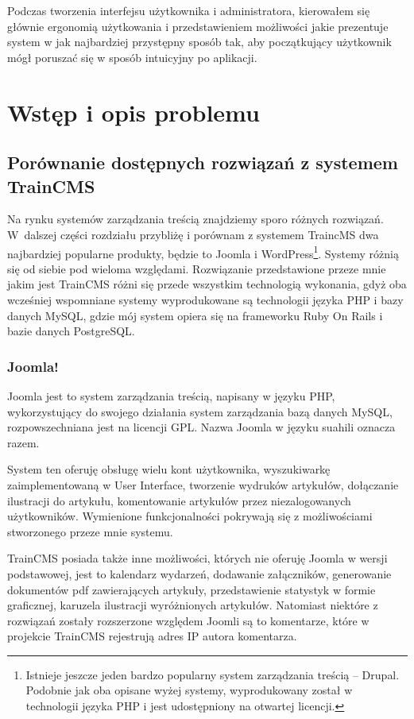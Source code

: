 \documentclass[openright]{xmgr}
\begin{document}
Podczas tworzenia interfejsu użytkownika i administratora, kierowałem się głównie ergonomią użytkowania i przedstawieniem możliwości jakie prezentuje system w jak najbardziej przystępny sposób tak, aby początkujący użytkownik mógł poruszać się w sposób intuicyjny po aplikacji.

\chapter{Wstęp i opis problemu}

\section{Porównanie dostępnych rozwiązań z systemem TrainCMS}

Na rynku systemów zarządzania treścią znajdziemy sporo różnych rozwiązań. W~dalszej części rozdziału przybliżę i porównam z systemem TraincMS dwa najbardziej popularne produkty, będzie to Joomla i WordPress\footnote{Istnieje jeszcze jeden bardzo popularny system zarządzania treścią -- Drupal. Podobnie jak oba opisane wyżej systemy, wyprodukowany został w technologii języka PHP i jest udostępniony na otwartej licencji.}. Systemy różnią się od siebie pod wieloma względami. Rozwiązanie przedstawione przeze mnie jakim jest TrainCMS różni się  przede wszystkim technologią wykonania, gdyż oba wcześniej wspomniane systemy wyprodukowane są technologii języka PHP i bazy danych MySQL, gdzie mój system opiera się na frameworku Ruby On Rails i bazie danych PostgreSQL.

\subsection{Joomla!}

Joomla jest to system zarządzania treścią, napisany w języku PHP, wykorzystujący do swojego działania system zarządzania bazą danych MySQL, rozpowszechniana jest na licencji GPL. Nazwa Joomla w języku suahili oznacza razem.

System ten oferuję obsługę wielu kont użytkownika, wyszukiwarkę zaimplementowaną w User Interface, tworzenie wydruków artykułów, dołączanie ilustracji do artykułu, komentowanie artykułów przez niezalogowanych użytkowników. Wymienione funkcjonalności pokrywają się z możliwościami stworzonego przeze mnie systemu. 

\newpage

TrainCMS posiada także inne możliwości, których nie oferuję Joomla w wersji podstawowej, jest to kalendarz wydarzeń, dodawanie załączników, generowanie dokumentów pdf zawierających artykuły, przedstawienie statystyk w formie graficznej, karuzela ilustracji wyróżnionych artykułów. Natomiast niektóre z rozwiązań zostały rozszerzone względem Joomli są to komentarze, które w projekcie TrainCMS rejestrują adres IP autora komentarza. 
\end{document}
